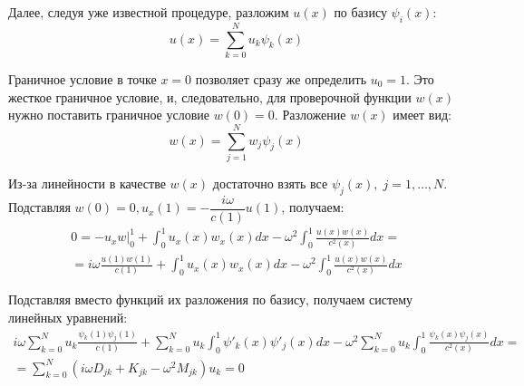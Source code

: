 \documentclass[12pt]{article}
\begin{document}
Далее, следуя уже известной процедуре, разложим $u(x)$ по базису $\psi_i(x)$:
\[
u(x) = \sum_{k=0}^N u_k \psi_k(x)
\]

Граничное условие в точке $x = 0$ позволяет сразу же определить $u_0 = 1$.
Это жесткое граничное условие, и, следовательно, для проверочной функции $w(x)$ нужно
поставить граничное условие $w(0) = 0$. Разложение $w(x)$ имеет вид:
\[
w(x) = \sum_{j=1}^N w_j \psi_j(x)
\]

Из-за линейности в качестве $w(x)$ достаточно взять все $\psi_j(x),\; j = 1,
\dots, N$. Подставляя $w(0) = 0, u_x(1) = -\dfrac{i\omega}{c(1)} u(1)$, получаем:
\begin{multline}
0 = -u_x w\Big|_0^1 + \int_0^1 u_x(x) w_x(x) dx - \omega^2 \int_0^1
\frac{u(x)w(x)}{c^2(x)}dx = \\ 
=
i\omega \frac{u(1) w(1)}{c(1)}
+ \int_0^1 u_x(x) w_x(x) dx 
- \omega^2 \int_0^1 \frac{u(x)w(x)}{c^2(x)} dx
\end{multline}

Подставляя вместо функций их разложения по базису, получаем систему линейных
уравнений:
\begin{multline}
i\omega \sum_{k=0}^N u_k \frac{\psi_k(1)\psi_j(1)}{c(1)}
+\sum_{k=0}^N u_k \int_0^1 \psi'_k(x) \psi'_j(x) dx
-\omega^2 \sum_{k=0}^N u_k \int_0^1 \frac{\psi_k(x) \psi_j(x)}{c^2(x)} dx = \\
= \sum_{k=0}^N \left(i\omega D_{jk} + K_{jk} -\omega^2 M_{jk}\right) u_k = 0
\end{multline}
\end{document}
